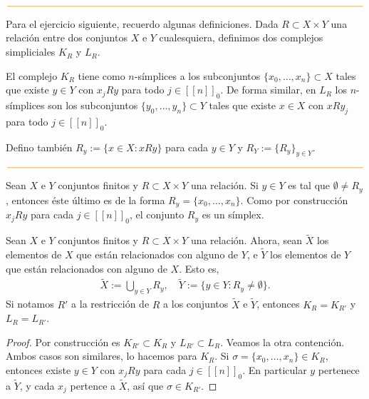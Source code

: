 \documentclass[11pt]{article}
\newcommand{\nat}[1]{[\![#1]\!]}
\newcommand{\natzero}[1]{\nat{#1}_0}
\newcommand{\paint}[1]{\color{color}{#1}}
\newenvironment{lemma}[2][Lema]{\begin{trivlist}
\item[\hskip \labelsep \paint{{\bfseries #1}}\hskip \labelsep {\bfseries #2.}]}{\end{trivlist}}
\newenvironment{obs}[2][Observaci\'on]{\begin{trivlist}
\item[\hskip \labelsep \paint{{\bfseries #1}}\hskip \labelsep {\bfseries #2.}]}{\end{trivlist}}
\begin{document}
\begin{center}
$\paint{
\rule{400pt}{0.5pt}
}$
\vspace{5pt}
\end{center}

Para el ejercicio siguiente, recuerdo algunas definiciones. Dada $R \subset X \times Y$ una relaci\'on entre dos conjuntos $X$ e $Y$ cualesquiera, definimos dos complejos simpliciales $K_R$ y $L_R$. 

El complejo $K_R$ tiene como $n$-s\'implices a los subconjuntos $\{x_0, \dots, x_n\} \subset X$ tales que existe $y \in Y$ con $x_jRy$ para todo $j \in \natzero{n}$. De forma similar, en $L_R$ los $n$-s\'implices son los subconjuntos $\{y_0, \dots, y_n\} \subset Y$ tales que existe $x \in X$ con $xRy_j$ para todo $j \in \natzero{n}$.

Defino tambi\'en $R_y := \{x \in X : xRy\}$ para cada $y \in Y$ y $R_Y := \{R_y\}_{y \in Y}$.
\begin{center}
$\paint{
\rule{400pt}{0.5pt}
}$
\vspace{15pt}
\end{center}

\begin{obs}{5} Sean $X$ e $Y$ conjuntos finitos y $R \subset X \times Y$ una relaci\'on. Si $y \in Y$ es tal que $\emptyset \neq R_y$, entonces \'este \'ultimo es de la forma $R_y = \{x_0, \dots, x_n\}$. Como por construcci\'on $x_jRy$ para cada $j \in \natzero{n}$, el conjunto $R_y$ es un s\'implex. 
\end{obs}

\begin{lemma}{6} Sean $X$ e $Y$ conjuntos finitos y $R \subset X \times Y$ una relaci\'on. Ahora, sean $\tilde{X}$ los elementos de $X$ que est\'an relacionados con alguno de $Y$, e $\tilde{Y}$ los elementos de $Y$ que est\'an relacionados con alguno de $X$. Esto es,
\begin{align*}
\tilde{X} := \bigcup_{y \in Y}R_y, \quad \tilde{Y} := \{y \in Y : R_y \neq \emptyset\}.
\end{align*}
Si notamos $R'$ a la restricci\'on de $R$ a los conjuntos $\tilde{X}$ e $\tilde{Y}$, entonces $K_R = K_{R'}$ y $L_R = L_{R'}$.
\end{lemma}
\begin{proof} Por construcci\'on es $K_{R'} \subset K_R$ y $L_{R'} \subset L_R$. Veamos la otra contenci\'on. Ambos casos son similares, lo hacemos para $K_R$. Si $\sigma = \{x_0, \dots, x_n\} \in K_R$, entonces existe $y \in Y$ con $x_jRy$ para cada $j \in \natzero{n}$. En particular $y$ pertenece a $\tilde{Y}$, y cada $x_j$ pertence a $\tilde{X}$, as\'i que $\sigma \in K_{R'}$.
\end{proof}
\end{document}
